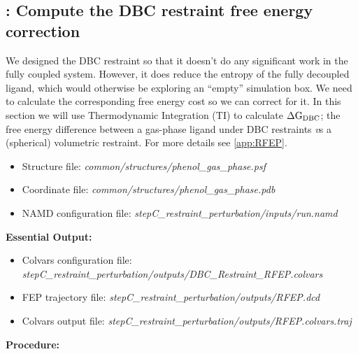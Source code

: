 \documentclass[9pt,tutorial]{Styling/livecoms}
\newcommand{\filepath}[1]{\textit{#1}}
\begin{document}
\subsection{\hspace{-1em}: Compute the DBC restraint free energy correction}
\label{step:restraintPerturbation}
    \begin{tcolorbox}[colback=blue!5!white,colframe=blue!75!black]
    We designed the DBC restraint so that it doesn't do any significant work in the fully coupled system. However, it does reduce the entropy of the fully decoupled ligand, which would otherwise be exploring an ``empty'' simulation box. We need to calculate the corresponding free energy cost so we can correct for it. In this section we will use Thermodynamic Integration (TI) to calculate $\Delta \rm G_{\rm{DBC}}$; the free energy difference between a gas-phase ligand under DBC restraints {\textit vs} a (spherical) volumetric restraint. For more details see \ref{app:RFEP}.
    \end{tcolorbox}

    \begin{itemize}
        \item Structure file: \filepath{common/structures/phenol\_gas\_phase.psf} 
        \item Coordinate file: \filepath{common/structures/phenol\_gas\_phase.pdb}
        \item NAMD configuration file: \filepath{stepC\_restraint\_perturbation/inputs/run.namd}
    \end{itemize}
    \textbf{Essential Output:}
    \begin{itemize}
        \item Colvars configuration file: \filepath{stepC\_restraint\_perturbation/outputs/DBC\_Restraint\_RFEP.colvars}
        \item FEP trajectory file: \filepath{stepC\_restraint\_perturbation/outputs/RFEP.dcd}
        \item Colvars output file: \filepath{stepC\_restraint\_perturbation/outputs/RFEP.colvars.traj}
    \end{itemize}
    \textbf{Procedure:}
\end{document}
